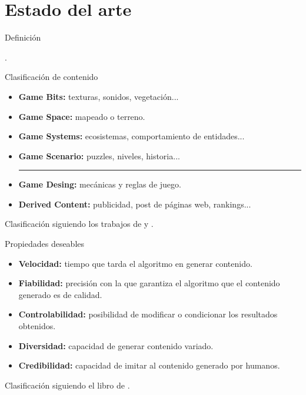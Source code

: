 \documentclass{beamer}
\begin{document}
\section{Estado del arte}

    \begin{frame}{Definición \scriptsize{\hfill \secname}}
    
     \cite{smith2015}.
        
    \end{frame}
    
    \begin{frame}{Clasificación de contenido \scriptsize{\hfill \secname}}
    
    \begin{itemize}
        \item \textbf{Game Bits:} texturas, sonidos, vegetación...
        \item \textbf{Game Space:} mapeado o terreno.
        \item \textbf{Game Systems:} ecosistemas, comportamiento de entidades...
        \item \textbf{Game Scenario:} puzzles, niveles, historia...
        \rule{9cm}{0.4pt}
        \item \textbf{Game Desing:} mecánicas y reglas de juego.
        \item \textbf{Derived Content:} publicidad, post de páginas web, rankings...
    \end{itemize}
    
    \bigskip
    
    \scriptsize{Clasificación siguiendo los trabajos de \cite{hendrikx2013} y \cite{barriga2019}.}
        
    \end{frame}
    
    \begin{frame}{Propiedades deseables \scriptsize{\hfill \secname}}
    
        \begin{itemize}
            \item \textbf{Velocidad:} tiempo que tarda el algoritmo en generar contenido.
            \item \textbf{Fiabilidad:} precisión con la que garantiza el algoritmo que el contenido generado es de calidad.
            \item \textbf{Controlabilidad:} posibilidad de modificar o condicionar los resultados obtenidos.
            \item \textbf{Diversidad:} capacidad de generar contenido variado.
            \item \textbf{Credibilidad:} capacidad de imitar al contenido generado por humanos.
        \end{itemize}
        
        \bigskip
        
        \scriptsize{Clasificación siguiendo el libro de \cite{shaker2016}.}
        
    \end{frame}
    
\end{document}
